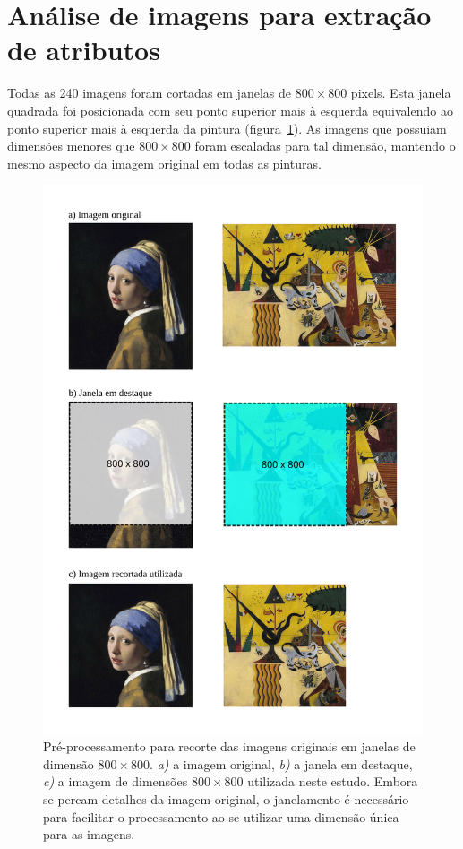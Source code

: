\section{Análise de imagens para extração de atributos}

Todas as 240 imagens foram cortadas em janelas de $800\times800$
pixels. Esta janela quadrada foi posicionada com seu ponto superior
mais à esquerda equivalendo ao ponto superior mais à esquerda da
pintura (figura~\ref{fig:janelamento}). As imagens que possuiam
dimensões menores que $800\times800$ foram escaladas para tal
dimensão, mantendo o mesmo aspecto da imagem original em todas as
pinturas.

\begin{figure}[ht!]
\begin{center}
        \caption{Pré-processamento para recorte das imagens originais em
        janelas de dimensão $800\times800$. \textit{a)} a imagem
        original, \textit{b)} a janela em destaque, \textit{c)} a
        imagem de dimensões $800\times800$ utilizada neste
        estudo. Embora se percam detalhes da imagem original, o
        janelamento é necessário para facilitar o processamento ao se
        utilizar uma dimensão única para as imagens.}
        \label{fig:janelamento}
        \includegraphics{figs/passos_janelamento}
      \fonteminha
\end{center}
\end{figure}

